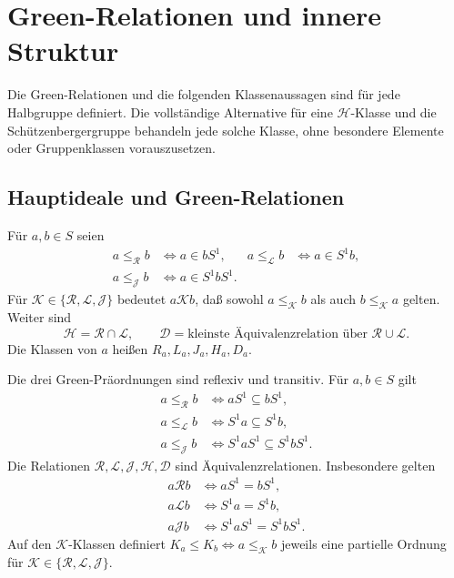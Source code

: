 \chapter{Green-Relationen und innere Struktur}
\label{b28guide:chap:green}

Die Green-Relationen und die folgenden Klassenaussagen sind für jede
Halbgruppe definiert. Die vollständige Alternative für eine
$\mathcal H$-Klasse und die Schützenbergergruppe behandeln jede solche
Klasse, ohne besondere Elemente oder Gruppenklassen vorauszusetzen.

\section{Hauptideale und Green-Relationen}

\begin{definition}
\label{b28guide:def:green}
Für $a,b\in S$ seien
\[
\begin{aligned}
a\leq_{\mathcal R}b&\iff a\in bS^1,&
a\leq_{\mathcal L}b&\iff a\in S^1b,\\
a\leq_{\mathcal J}b&\iff a\in S^1bS^1.
\end{aligned}
\]
Für $\mathcal K\in\{\mathcal R,\mathcal L,\mathcal J\}$ bedeutet
$a\mathrel{\mathcal K}b$, daß sowohl $a\leq_{\mathcal K}b$ als auch
$b\leq_{\mathcal K}a$ gelten. Weiter sind
\[
\mathcal H=\mathcal R\cap\mathcal L,
\qquad
\mathcal D=\text{kleinste Äquivalenzrelation über }
\mathcal R\cup\mathcal L.
\]
Die Klassen von $a$ heißen $R_a,L_a,J_a,H_a,D_a$.
\end{definition}

\begin{theorem}
\label{b28guide:thm:green-preorders}
Die drei Green-Präordnungen sind reflexiv und transitiv. Für $a,b\in S$
gilt
\[
\begin{aligned}
a\leq_{\mathcal R}b&\iff aS^1\subseteq bS^1,\\
a\leq_{\mathcal L}b&\iff S^1a\subseteq S^1b,\\
a\leq_{\mathcal J}b&\iff S^1aS^1\subseteq S^1bS^1.
\end{aligned}
\]
Die Relationen $\mathcal R,\mathcal L,\mathcal J,\mathcal H,\mathcal D$
sind Äquivalenzrelationen. Insbesondere gelten
\[
\begin{aligned}
a\mathrel{\mathcal R}b&\iff aS^1=bS^1,\\
a\mathrel{\mathcal L}b&\iff S^1a=S^1b,\\
a\mathrel{\mathcal J}b&\iff S^1aS^1=S^1bS^1.
\end{aligned}
\]
Auf den $\mathcal K$-Klassen definiert
$K_a\leq K_b\iff a\leq_{\mathcal K}b$ jeweils eine partielle Ordnung
für $\mathcal K\in\{\mathcal R,\mathcal L,\mathcal J\}$.
\cite{howie,green1951}
\end{theorem}

